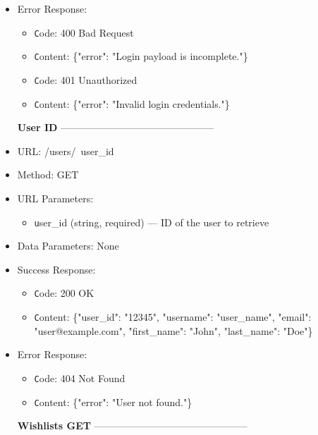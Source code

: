 \begin{itemize}
\begin{itemize}
\end{itemize}  

\item Error Response:
\begin{itemize}  
  \item \texttt Code: 400 Bad Request  
  \item \texttt Content:  \{"error": "Login payload is incomplete."\}
     
  \item \texttt Code: 401 Unauthorized  
  \item \texttt Content: \{"error": "Invalid login credentials."\}
     
\end{itemize}  

\item[\textbf{User ID}] -----------------------------------------------

\item URL: /users/\ user\_id\    
\item Method:  GET  
\item URL Parameters:
\begin{itemize}  
  \item \texttt user\_id   (string, required) — ID of the user to retrieve
\end{itemize}  
\item Data Parameters: None
\item Success Response:
\begin{itemize}  
  \item \texttt Code: 200 OK  
  \item \texttt Content:  \{"user\_id": "12345",
    "username": "user\_name",
    "email": "user@example.com",
    "first\_name": "John",
    "last\_name": "Doe"\}

\end{itemize} 

\item Error Response:
\begin{itemize}  
  \item \texttt Code: 404 Not Found  
  \item \texttt Content: \{"error": "User not found."\}  
\end{itemize}  

\item[\textbf{Wishlists GET}] -----------------------------------------------


\end{itemize}
